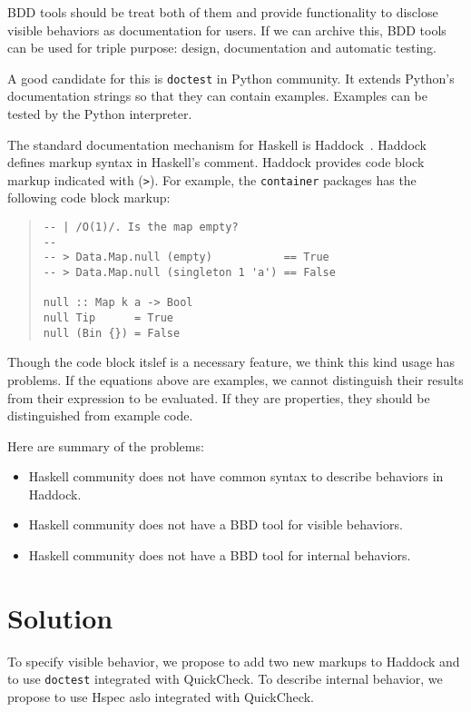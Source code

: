 \documentclass[preprint]{sigplanconf}
\newcommand{\hspec}{Hspec}
\begin{document}
BDD tools should be treat both of them and provide functionality
to disclose visible behaviors as documentation for users.
If we can archive this, BDD tools can be used for
triple purpose: design, documentation and automatic testing.

A good candidate for this is {\tt doctest} in Python community.
It extends Python's documentation strings so that they
can contain examples.
Examples can be tested by the Python interpreter.

The standard documentation mechanism for Haskell is
Haddock~\cite{haddock}.
Haddock defines markup syntax in Haskell's comment.
Haddock provides code block markup indicated with ({\tt >}).
For example, the {\tt container} packages has the following code block markup:

\begin{quote}
\small
\begin{verbatim}
-- | /O(1)/. Is the map empty?
--
-- > Data.Map.null (empty)           == True
-- > Data.Map.null (singleton 1 'a') == False

null :: Map k a -> Bool
null Tip      = True
null (Bin {}) = False
\end{verbatim}
\end{quote}

\noindent Though the code block itslef is a necessary feature,
we think this kind usage has problems.
If the equations above are examples, we cannot distinguish
their results from their expression to be evaluated.
If they are properties, they should be distinguished
from example code.

Here are summary of the problems:

\begin{itemize}
\item Haskell community does not have common syntax to describe
behaviors in Haddock.
\item Haskell community does not have a BBD tool for visible behaviors.
\item Haskell community does not have a BBD tool for internal behaviors.
\end{itemize}

\section{Solution}

To specify visible behavior, we propose to add two new markups to Haddock and to use {\tt doctest} integrated with QuickCheck. To describe internal behavior, we propose to use \hspec{} aslo integrated with QuickCheck.
\end{document}
